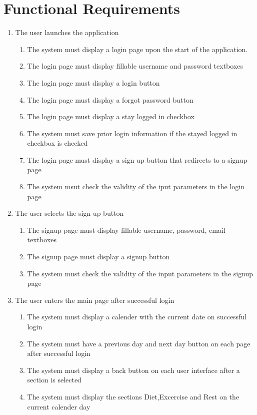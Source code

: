 \documentclass[12pt,letterpaper]{article}
\begin{document}
\section{Functional Requirements}
\begin{enumerate}[{BE}1.] 
\item The user launches the application
\begin{enumerate}[{FR}1.]
\item  The system must display a login page upon the start of the application.
\item  The login page must display fillable username and password  textboxes
\item  The login page must display a login button
\item  The login page must display a forgot password button
\item  The login page must display a stay logged in checkbox
\item  The system must save prior login information if the stayed logged in checkbox is checked
\item  The login page must display a sign up button that redirects to a signup page
\item  The system msut check the validity of the iput parameters in the login page
\end{enumerate}

\item The user selects the sign up button
\begin{enumerate}[resume*]
\item  The signup page must display fillable username, password, email textboxes
\item  The signup page must display a signup button
\item  The system must check the validity of the input parameters in the signup page
\end{enumerate}

\item The user enters the main page after successful login
\begin{enumerate}[resume*]
\item  The system must display a calender with the current date on successful login
\item  The system must have a previous day and next day button on each page after successful login
\item  The system must display a back button on each user interface after a section is selected
\item  The system must display the sections Diet,Excercise and Rest on the current calender day
\end{enumerate}


\end{enumerate}
\end{document}
